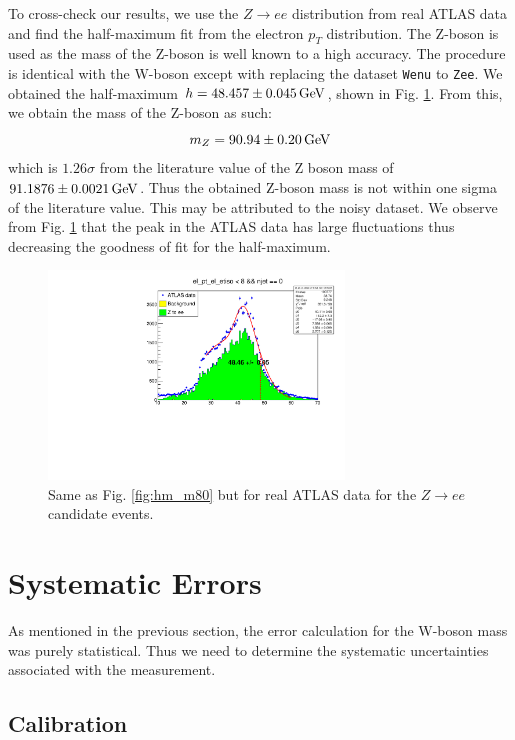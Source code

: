 \documentclass[a4paper]{report}
\numberwithin{equation}{section}
\begin{document}
To cross-check our results, we use the $Z \rightarrow ee$ distribution from real ATLAS data and find the half-maximum fit from 
the electron $p_T$ distribution. The Z-boson is used as the mass of the Z-boson is well known to a high accuracy. 
The procedure is identical with the W-boson except with replacing the dataset \texttt{Wenu} to 
\texttt{Zee}. We obtained the half-maximum $h = \SI{48.457 \pm 0.045}{\giga\electronvolt}$, shown in Fig. \ref{fig:hm_zee}. From this, 
we obtain the mass of the Z-boson as such: 
\begin{equation}
    m_Z = \SI{90.94 \pm 0.20}{\giga\electronvolt}
\end{equation}
which is $1.26\sigma$ from the literature value of the Z boson mass of $\SI{91.1876 \pm 0.0021}{\giga\electronvolt}$. Thus the 
obtained Z-boson mass is not within one sigma of the literature value. This may be attributed to the noisy dataset. We observe from 
Fig. \ref{fig:hm_zee} that the peak in the ATLAS data has large fluctuations thus decreasing the goodness of fit for the half-maximum.

\begin{figure}[htpb]
    \centering
    \includegraphics[width=0.7\textwidth]{hm_zee.pdf}
    \caption{Same as Fig. \ref{fig:hm_m80} but for real ATLAS data for the $Z \rightarrow ee$ candidate events.}
    \label{fig:hm_zee}
\end{figure}

\section{Systematic Errors}

As mentioned in the previous section, the error calculation for the W-boson mass was purely statistical. Thus we need to determine 
the systematic uncertainties associated with the measurement. 

\subsection{Calibration}
\end{document}
